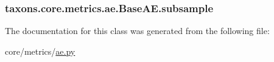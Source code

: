 \subsubsection[{\texorpdfstring{subsample}{subsample}}]{\setlength{\rightskip}{0pt plus 5cm}taxons.\+core.\+metrics.\+ae.\+Base\+A\+E.\+subsample}\hypertarget{classtaxons_1_1core_1_1metrics_1_1ae_1_1_base_a_e_a4e28d7ab4936d2196f94a4da394c9011}{}\label{classtaxons_1_1core_1_1metrics_1_1ae_1_1_base_a_e_a4e28d7ab4936d2196f94a4da394c9011}


The documentation for this class was generated from the following file\+:\begin{DoxyCompactItemize}
\item 
core/metrics/\hyperlink{ae_8py}{ae.\+py}\end{DoxyCompactItemize}

